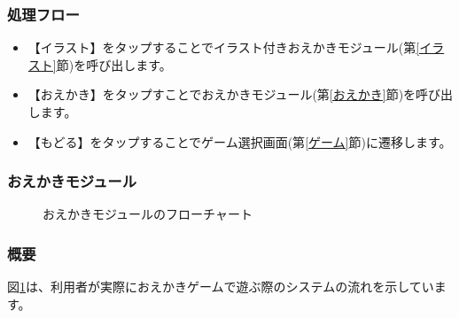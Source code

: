 \documentclass[a4j]{jarticle}
\begin{document}
\subsubsection*{処理フロー}
\begin{itemize}
\item【イラスト】をタップすることでイラスト付きおえかきモジュール(第\ref{イラスト}節)を呼び出します。
\item【おえかき】をタップすことでおえかきモジュール(第\ref{おえかき}節)を呼び出します。
\item【もどる】をタップすることでゲーム選択画面(第\ref{ゲーム}節)に遷移します。
\end{itemize}

\newpage
\subsubsection{おえかきモジュール\label{おえかき}}
\begin{figure}[H]
    \begin{center}
    \caption {おえかきモジュールのフローチャート}
    \label{oekaki2}
    \end{center}
\end{figure}

\subsubsection*{概要}
図\ref{oekaki2}は、利用者が実際におえかきゲームで遊ぶ際のシステムの流れを示しています。
\end{document}
